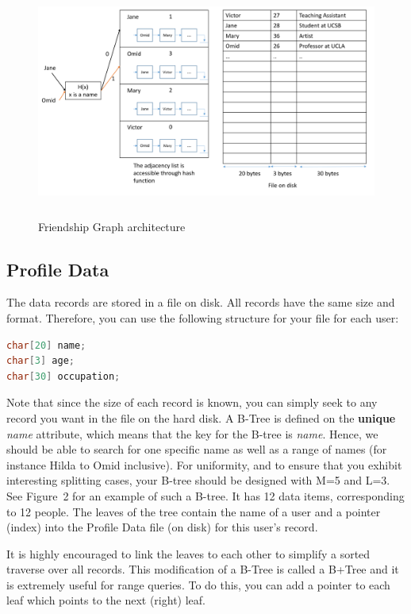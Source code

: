 \documentclass[times, 12pt]{article}
\begin{document}
\begin{figure}[H]
    \centering
    \includegraphics[width=7in,height=3in]{Architecture_updated}
    \caption{Friendship Graph architecture}
    \label{fig:graph}
\end{figure}

\subsection{Profile Data}
The data records are stored in a file on disk. All records have the same size and format. Therefore, you can use the following structure for your file for each user:
\begin{lstlisting}[language=C++,
    directivestyle={\color{black}}
    emph={int,char,double,float,unsigned},
    emphstyle={\color{green}}
    ]
char[20] name;
char[3] age;
char[30] occupation;
\end{lstlisting}

Note that since the size of each record is known, you can simply seek to any record you want in the file on the hard disk. %
A B-Tree is defined on the {\bf unique} {\em name} attribute, which means that the key for the B-tree is {\em name}. Hence, we should be able to search for one specific name as well as a range of names (for instance Hilda to Omid inclusive). For uniformity, and to ensure that you exhibit interesting splitting cases, your B-tree should be designed with M=5 and L=3. See Figure~2 for an example of such a B-tree.  It has 12 data items, corresponding to 12 people.  The leaves of the tree contain the name of a user and a pointer (index) into the Profile Data file (on disk) for this user's record.

It is highly encouraged to link the leaves to each other to simplify a sorted traverse over all records. This modification of a B-Tree is called a B+Tree and it is extremely useful for range queries. To do this, you can add a pointer to each leaf which points to the next (right) leaf.
\end{document}
